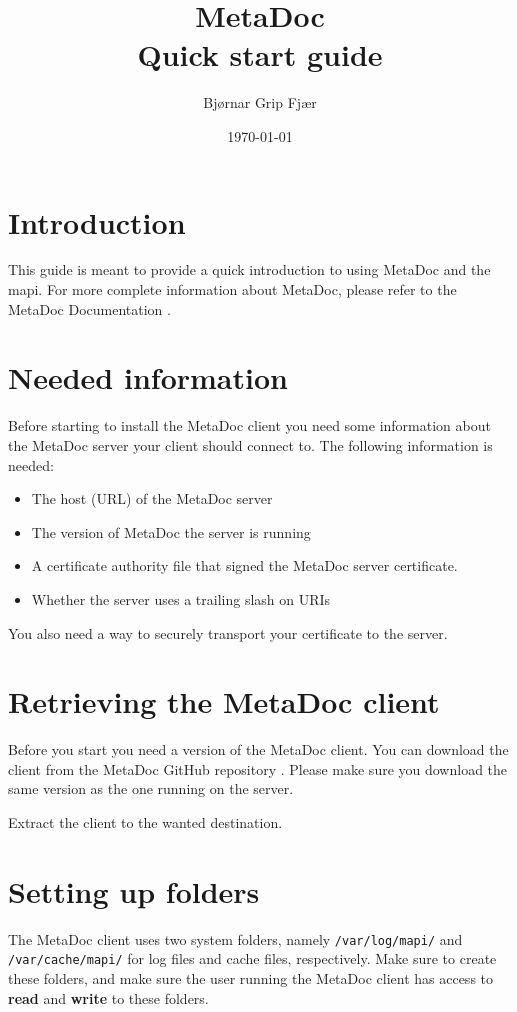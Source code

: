 \documentclass[titlepage, a4paper,10pt]{article}
\title{MetaDoc\\Quick start guide}
\author{Bjørnar Grip Fjær}
\date{\today}
\begin{document}
\maketitle

\section{Introduction}
This guide is meant to provide a quick introduction to using MetaDoc and the
\gls{mapi}. For more complete information about MetaDoc, please refer to the
MetaDoc Documentation \cite{mdoc}.

\section{Needed information}
Before starting to install the MetaDoc client you need some information about
the MetaDoc server your client should connect to. The following information is
needed:

\begin{itemize}
    \item
        The host (URL) of the MetaDoc server
    \item
        The version of MetaDoc the server is running
    \item
        A certificate authority file that signed the MetaDoc server
        certificate.
    \item
        Whether the server uses a trailing slash on URIs
\end{itemize}

You also need a way to securely transport your certificate to the server.

\section{Retrieving the MetaDoc client}
Before you start you need a version of the MetaDoc client. You can download the
client from the MetaDoc GitHub repository \cite{downloads}. Please make sure
you download the same version as the one running on the server. 

Extract the client to the wanted destination. 

\section{Setting up folders}
The MetaDoc client uses two system folders, namely \texttt{/var/log/mapi/} and
\\ \texttt{/var/cache/mapi/} for log files and cache files, respectively. Make
sure to create these folders, and make sure the user running the MetaDoc client
has access to \textbf{read} and \textbf{write} to these folders. 
\end{document}
